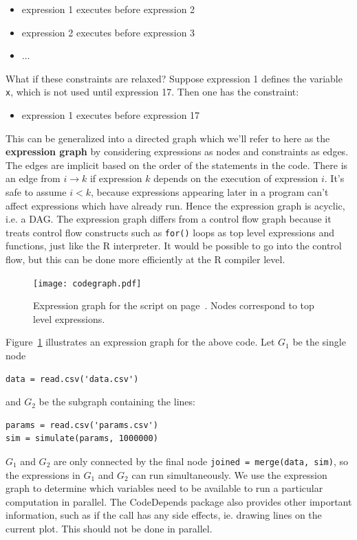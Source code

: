 \documentclass[12pt]{article}
\begin{document}
\begin{itemize}
    \item expression 1 executes before expression 2
    \item expression 2 executes before expression 3
    \item $\dots$
\end{itemize}
What if these constraints are relaxed? Suppose expression 1 defines the variable
\texttt{x}, which is not used until expression 17. Then one has the
constraint:
\begin{itemize}
    \item expression 1 executes before expression 17
\end{itemize}
This can be generalized into a directed graph which we'll refer to here as
the \textbf{expression graph} by considering expressions as
nodes and constraints as edges. The edges are implicit based on the order
of the statements in the code. There is an edge from $i \rightarrow k$ if
expression $k$ depends on the execution of expression $i$.  It's safe to
assume $i < k$, because expressions appearing later in a program can't
affect expressions which have already run. Hence the expression graph is
acyclic, i.e. a DAG. The expression graph differs from a control flow
graph because it treats control flow constructs such as \texttt{for()}
loops as top level expressions and functions, just like the R interpreter.
It would be possible to go into the control flow, but this can be done more
efficiently at the R compiler level.



\begin{figure}
  \centering
  \texttt{[image: codegraph.pdf]}
  \caption{Expression graph for the script on
  page~\pageref{list:simple}. Nodes correspond to top level expressions.}
  \label{fig:codegraph}
\end{figure}

Figure~\ref{fig:codegraph} illustrates an expression graph for the above
code.
Let $G_1$ be the single node 
\begin{verbatim}
data = read.csv('data.csv')
\end{verbatim}
and $G_2$ be the subgraph containing the lines:
\begin{verbatim}
params = read.csv('params.csv')
sim = simulate(params, 1000000)
\end{verbatim}
$G_1$ and $G_2$ are only connected by the final node \texttt{joined =
merge(data, sim)}, so the expressions in $G_1$ and $G_2$ can run
simultaneously.  We use the expression graph to determine which variables
need to be available to run a particular computation in parallel. The
CodeDepends package also provides other important information, such as if
the call has any side effects, ie. drawing lines on the current plot. This
should not be done in parallel.
\end{document}
